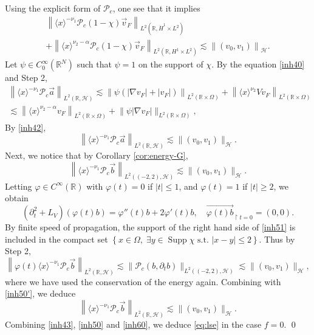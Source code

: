 \documentclass[10pt,leqno]{amsart}
\theoremstyle{definition}%
\theoremstyle{remark}
\numberwithin{equation}{section}
\newcommand{\R}{\mathbb{R}}
\newcommand{\supp}{\operatorname{Supp}}
\renewcommand{\^}{\widehat}%
\newcommand{\la}{\langle}
\newcommand{\ra}{\rangle}
\newcommand{\HHH}{\mathcal{H}}
\newcommand{\PPP}{\mathcal{P}}
\begin{document}
	Using the explicit form of $\PPP_c$, one see that it implies
	\begin{multline}
	\label{inh43}
\left\| \la x\ra^{-\nu_1}\PPP_c(1-\chi)\vec{v}_F\right\|_{L^2(\R,\dot{H}^1\times L^2)}\\
+\left\| \la x\ra^{\nu_2-\alpha}\PPP_c(1-\chi)\vec{v}_F\right\|_{L^2(\R,H^1\times L^2)}\lesssim \left\|(v_0,v_1)\right\|_{\HHH}.
	\end{multline}
	Let $\psi\in C_0^{\infty}(\R^N)$ such that $\psi=1$ on the support of $\chi$. By the equation \eqref{inh40} and Step 2,
	\begin{multline*}
	\left\| \la x\ra^{-\nu_1} \PPP_c\vec{a}\right\|_{L^2(\R,\HHH)}\lesssim \left\|\psi\left(|\nabla v_F|+|v_F| \right)\right\|_{L^2(\R\times \Omega)}+ \left\| \la x\ra^{\nu_2} V v_F\right\|_{L^2(\R\times\Omega)}\\
	\lesssim  \left\| \langle x\rangle^{\nu_2-\alpha} v_F\right\|_{L^2(\R\times \Omega)}+\big\|\psi |\nabla v_F|\big\|_{L^2(\R\times \Omega)},
	\end{multline*}
	By \eqref{inh42},
	\begin{equation}
	\label{inh50} 
	\left\|\la x\ra^{-\nu_1}\PPP_c \vec{a}\right\|_{L^2(\R,\HHH)}\lesssim \|(v_0,v_1)\|_{\HHH}.
	\end{equation} 
	Next, we notice that by Corollary \ref{cor:energy-G},
	\begin{equation}
	\label{inh50'}
	\left\|\la x\ra^{-\nu_1}\PPP_c \vec{b}\right\|_{L^2\left((-2,2),\HHH\right)}\lesssim \|(v_0,v_1)\|_{\HHH}. 
	\end{equation} 
	Letting $\varphi\in C^{\infty}(\R)$ with $\varphi(t)=0$ if $|t|\leq 1$, and $\varphi(t)=1$ if $|t|\geq 2$, we obtain
	\begin{equation}
	\label{inh51}
	(\partial_t^2+L_V)(\varphi(t)b)=\varphi''(t)b+2\varphi'(t)b,\quad \overrightarrow{\varphi(t)b}_{\restriction t=0}=(0,0).
	\end{equation} 
	By finite speed of propagation, the support of the right hand side of \eqref{inh51} is included in the compact set $\left\{x\in \Omega,\; \exists y\in \supp \chi\text{ s.t. }|x-y|\leq 2\right\}$. Thus by Step 2,
	\begin{equation*}
	\left\|\varphi(t)\la x\ra^{-\nu_1}\PPP_c \vec{b}\right\|_{L^2\left(\R,\HHH\right)}\lesssim \|\PPP_c(b,\partial_tb)\|_{L^2((-2,2),\HHH)}\lesssim \|(v_0,v_1)\|_{\HHH},
	\end{equation*} 
	where we have used the conservation of the energy again. Combining with \eqref{inh50'}, we deduce
	\begin{equation}
	\label{inh60}
	\left\|\la x\ra^{-\nu_1}\PPP_c \vec{b}\right\|_{L^2\left(\R,\HHH\right)}\lesssim \|(v_0,v_1)\|_{\HHH}.
	\end{equation} 
	Combining \eqref{inh43}, \eqref{inh50} and \eqref{inh60}, we deduce \eqref{eq:lse} in the case $f=0$. 
\qed
\end{document}
